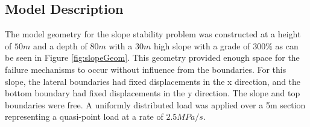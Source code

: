 \subsection{Model Description}

The model geometry for the slope stability problem was constructed at a height of $50m$ and a depth of $80m$ with a $30m$ high slope with a grade of $300\%$ as can be seen in Figure \ref{fig:slopeGeom}. This geometry provided enough space for the failure mechanisms to occur without influence from the boundaries. For this slope, the lateral boundaries had fixed displacements in the x direction, and the bottom boundary had fixed displacements in the y direction. The slope and top boundaries were free. A uniformly distributed load was applied over a 5m section representing a quasi-point load at a rate of $2.5 MPa/s$. 
